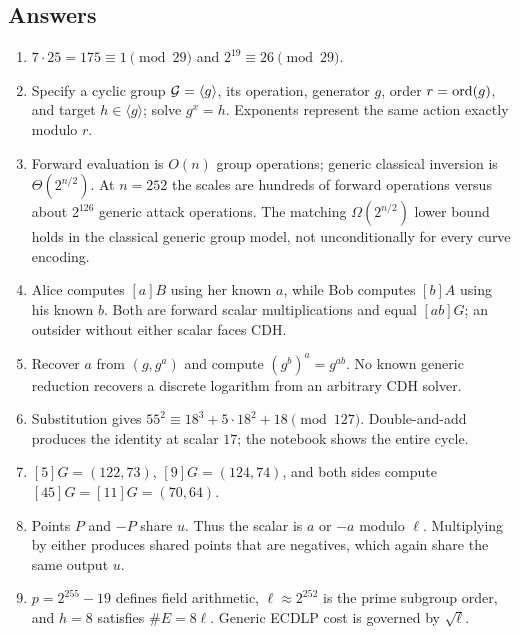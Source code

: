 \subsection*{Answers}

\begin{enumerate}
  \item $7\cdot25=175\equiv1\pmod{29}$ and $2^{19}\equiv26\pmod{29}$.

  \item Specify a cyclic group $\mathcal{G}=\langle g\rangle$, its operation, generator
        $g$, order $r=\operatorname{ord}(g)$, and target $h\in\langle g\rangle$; solve
        $g^x=h$. Exponents represent the same action exactly modulo $r$.

  \item Forward evaluation is $O(n)$ group operations; generic classical
        inversion is $\Theta(2^{n/2})$. At $n=252$ the scales are hundreds of
        forward operations versus about $2^{126}$ generic attack operations.
        The matching $\Omega(2^{n/2})$ lower bound holds in the classical
        generic group model, not unconditionally for every curve encoding.

  \item Alice computes $[a]B$ using her known $a$, while Bob computes $[b]A$
        using his known $b$. Both are forward scalar multiplications and equal
        $[ab]G$; an outsider without either scalar faces CDH.

  \item Recover $a$ from $(g,g^a)$ and compute $(g^b)^a=g^{ab}$. No known
        generic reduction recovers a discrete logarithm from an arbitrary CDH
        solver.

  \item Substitution gives $55^2\equiv18^3+5\cdot18^2+18\pmod{127}$.
        Double-and-add produces the identity at scalar $17$; the notebook shows
        the entire cycle.

  \item $[5]G=(122,73)$, $[9]G=(124,74)$, and both sides compute
        $[45]G=[11]G=(70,64)$.

  \item Points $P$ and $-P$ share $u$. Thus the scalar is $a$ or $-a$ modulo
        $\ell$. Multiplying by either produces shared points that are negatives,
        which again share the same output $u$.

  \item $p=2^{255}-19$ defines field arithmetic,
        $\ell\approx2^{252}$ is the prime subgroup order, and $h=8$ satisfies
        $\#E=8\ell$. Generic ECDLP cost is governed by $\sqrt\ell$.


\end{enumerate}
